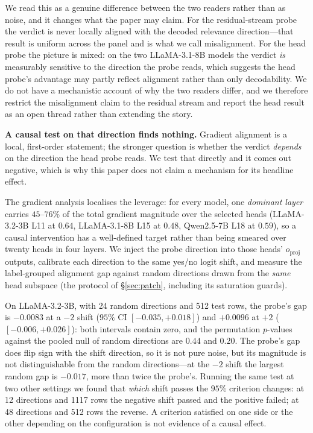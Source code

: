 \documentclass[11pt]{article}
\begin{document}
We read this as a genuine difference between the two readers rather than as
noise, and it changes what the paper may claim. For the residual-stream probe the
verdict is never locally aligned with the decoded relevance direction---that
result is uniform across the panel and is what we call misalignment. For the
head probe the picture is mixed: on the two LLaMA-3.1-8B models the verdict
\emph{is} measurably sensitive to the direction the probe reads, which suggests
the head probe's advantage may partly reflect alignment rather than only
decodability. We do not have a mechanistic account of why the two readers differ,
and we therefore restrict the misalignment claim to the residual stream and
report the head result as an open thread rather than extending the story.

\textbf{A causal test on that direction finds nothing.} Gradient alignment is a
local, first-order statement; the stronger question is whether the verdict
\emph{depends} on the direction the head probe reads. We test that directly and
it comes out negative, which is why this paper does not claim a mechanism for its
headline effect.

The gradient analysis localises the leverage: for every model, one \emph{dominant
layer} carries $45$--$76\%$ of the total gradient magnitude over the selected
heads (LLaMA-3.2-3B L11 at $0.64$, LLaMA-3.1-8B L15 at $0.48$, Qwen2.5-7B L18 at
$0.59$), so a causal intervention has a well-defined target rather than being
smeared over twenty heads in four layers. We inject the probe direction into
those heads' $o_{\text{proj}}$ outputs, calibrate each direction to the same
yes/no logit shift, and measure the label-grouped alignment gap against random
directions drawn from the \emph{same} head subspace (the protocol of
\S\ref{sec:patch}, including its saturation guards).

On LLaMA-3.2-3B, with 24 random directions and 512 test rows, the probe's gap is
$-0.0083$ at a $-2$ shift ($95\%$ CI $[-0.035,+0.018]$) and $+0.0096$ at $+2$
($[-0.006,+0.026]$): both intervals contain zero, and the permutation
$p$-values against the pooled null of random directions are $0.44$ and $0.20$.
The probe's gap does flip sign with the shift direction, so it is not pure noise,
but its magnitude is not distinguishable from the random directions---at the
$-2$ shift the largest random gap is $-0.017$, more than twice the probe's. Running the same test at two other
settings we found that \emph{which} shift passes the $95\%$ criterion changes:
at 12 directions and 1117 rows the negative shift passed and the positive failed;
at 48 directions and 512 rows the reverse. A criterion satisfied on one side or
the other depending on the configuration is not evidence of a causal effect.
\end{document}

